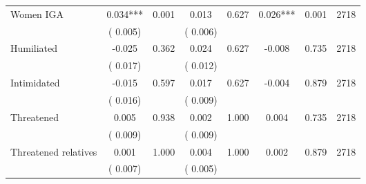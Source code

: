 \begin{tabular}{l*{7}{c}}
 Women IGA       &              0.034***       &        0.001  &              0.013       &        0.627  &              0.026***       &              0.001 &  2718 \\ 
                       &       (       0.005)             &                               &       (       0.006)                     &                               &                                               &                                &                      \\ 

 Humiliated       &             -0.025       &        0.362  &              0.024       &        0.627  &             -0.008       &              0.735 &  2718 \\ 
                       &       (       0.017)             &                               &       (       0.012)                     &                               &                                               &                                &                      \\ 

 Intimidated       &             -0.015       &        0.597  &              0.017       &        0.627  &             -0.004       &              0.879 &  2718 \\ 
                       &       (       0.016)             &                               &       (       0.009)                     &                               &                                               &                                &                      \\ 

 Threatened       &              0.005       &        0.938  &              0.002       &        1.000  &              0.004       &              0.735 &  2718 \\ 
                       &       (       0.009)             &                               &       (       0.009)                     &                               &                                               &                                &                      \\ 

 Threatened relatives       &              0.001       &        1.000  &              0.004       &        1.000  &              0.002       &              0.879 &  2718 \\ 
                       &       (       0.007)             &                               &       (       0.005)                     &                               &                                               &                                &                      \\ 


\end{tabular}
